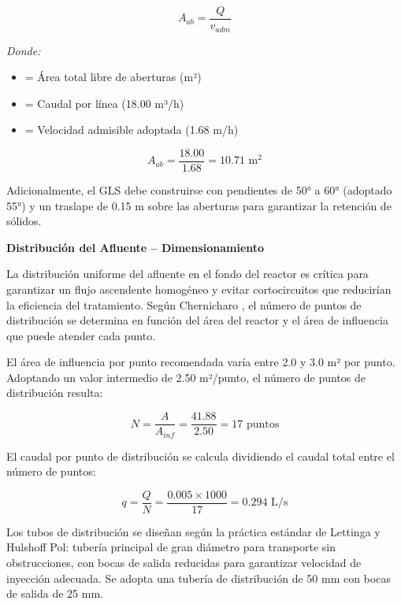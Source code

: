 \documentclass[12pt,a4paper]{article}
\newcommand{\captionequation}[1]{}  %
\begin{document}
\begin{equation}
A_{ab} = \frac{Q}{v_{adm}}
\end{equation}
\captionequation{Area minima de aberturas GLS}

\textit{Donde:}
\begin{itemize}[noitemsep,leftmargin=2em]
    \item[$A_{ab}$] = Área total libre de aberturas (m²)
    \item[$Q$] = Caudal por línea (18.00 m³/h)
    \item[$v_{adm}$] = Velocidad admisible adoptada (1.68 m/h)
\end{itemize}

\begin{equation}
A_{ab} = \frac{18.00}{1.68} = 10.71 \text{ m}^2
\end{equation}

Adicionalmente, el GLS debe construirse con pendientes de 50° a 60° (adoptado 55°) y un traslape de 0.15 m sobre las aberturas para garantizar la retención de sólidos.

\textbf{Distribución del Afluente -- Dimensionamiento}

La distribución uniforme del afluente en el fondo del reactor es crítica para garantizar un flujo ascendente homogéneo y evitar cortocircuitos que reducirían la eficiencia del tratamiento. Según Chernicharo \cite{chernicharo2007}, el número de puntos de distribución se determina en función del área del reactor y el área de influencia que puede atender cada punto.

El área de influencia por punto recomendada varía entre 2.0 y 3.0 m² por punto. Adoptando un valor intermedio de 2.50 m²/punto, el número de puntos de distribución resulta:

\begin{equation}
N = \frac{A}{A_{inf}} = \frac{41.88}{2.50} = 17 \text{ puntos}
\end{equation}
\captionequation{Numero de puntos de distribucion del afluente}

El caudal por punto de distribución se calcula dividiendo el caudal total entre el número de puntos:

\begin{equation}
q = \frac{Q}{N} = \frac{0.005 \times 1000}{17} = 0.294 \text{ L/s}
\end{equation}

Los tubos de distribución se diseñan según la práctica estándar de Lettinga y Hulshoff Pol: tubería principal de gran diámetro para transporte sin obstrucciones, con bocas de salida reducidas para garantizar velocidad de inyección adecuada. Se adopta una tubería de distribución de 50 mm con bocas de salida de 25 mm.
\end{document}
